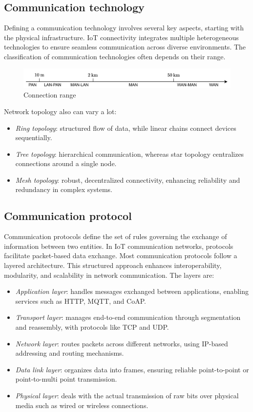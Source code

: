 \subsection{Communication technology}
Defining a communication technology involves several key aspects, starting with the physical infrastructure.
IoT connectivity integrates multiple heterogeneous technologies to ensure seamless communication across diverse environments. 
The classification of communication technologies often depends on their range.
\begin{figure}[H]
    \centering
    \includegraphics[width=1\linewidth]{images/iot6.png}
    \caption{Connection range}
\end{figure}
\noindent Network topology also can vary a lot: 
\begin{itemize}
    \item \textit{Ring topology}: structured flow of data, while linear chains connect devices sequentially. 
    \item \textit{Tree topology}: hierarchical communication, whereas star topology centralizes connections around a single node. 
    \item \textit{Mesh topology}: robust, decentralized connectivity, enhancing reliability and redundancy in complex systems.
\end{itemize}

\subsection{Communication protocol}
Communication protocols define the set of rules governing the exchange of information between two entities. 
In IoT communication networks, protocols facilitate packet-based data exchange.
Most communication protocols follow a layered architecture. 
This structured approach enhances interoperability, modularity, and scalability in network communication. 
The layers are:
\begin{itemize}
    \item \textit{Application layer}: handles messages exchanged between applications, enabling services such as HTTP, MQTT, and CoAP.
    \item \textit{Transport layer}: manages end-to-end communication through segmentation and reassembly, with protocols like TCP and UDP.
    \item \textit{Network layer}: routes packets across different networks, using IP-based addressing and routing mechanisms.
    \item \textit{Data link layer}: organizes data into frames, ensuring reliable point-to-point or point-to-multi point transmission.
    \item \textit{Physical layer}: deals with the actual transmission of raw bits over physical media such as wired or wireless connections.
\end{itemize}